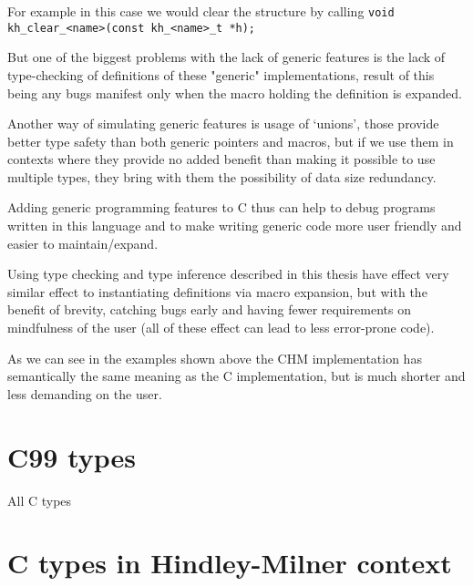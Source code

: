 For example in this case we would clear the structure by calling
\lstinline{void kh_clear_<name>(const kh_<name>_t *h);}


But one of the biggest problems with the lack of generic features is the lack of type-checking
of definitions of these "generic" implementations, result of this being any bugs manifest only
when the macro holding the definition is expanded.

Another way of simulating generic features is usage of `unions', those provide better type safety
than both generic pointers and macros, but if we use them in contexts where they provide no added benefit
than making it possible to use multiple types, they bring with them the possibility of data size redundancy.

Adding generic programming features to C thus can help to debug programs written in this language and
to make writing generic code more user friendly and easier to maintain/expand. %


Using type checking and type inference described in this thesis have effect very similar effect to instantiating
definitions via macro expansion, but with the benefit of brevity, catching bugs early and having fewer
requirements on mindfulness of the user (all of these effect can lead to less error-prone code).


As we can see in the examples shown above the CHM implementation has semantically the same meaning as the C
implementation, but is much shorter and less demanding on the user.


\section{C99 types}


All C types

\section{C types in Hindley-Milner context}

